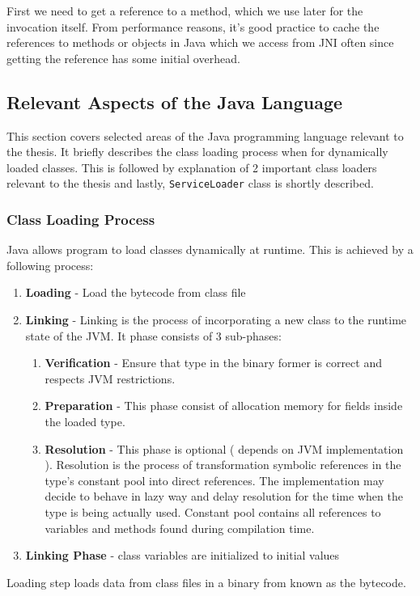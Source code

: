 First we need to get a reference to a method, which we use later for the invocation itself. From performance reasons, it's good practice to cache the references to methods or objects in Java which we access from JNI often since getting the reference has some initial overhead.

\subsection{Relevant Aspects of the  Java Language}
This section covers selected areas of the Java programming language relevant to the thesis. It briefly describes the class loading process when for dynamically loaded classes. This is followed by explanation of 2 important class loaders relevant to the thesis and lastly, \texttt{ServiceLoader} class is shortly described.
\subsubsection{Class Loading Process}
Java allows program to load classes dynamically at runtime. This is achieved by a following process:
\begin{enumerate}
	\item \textbf{Loading} - Load the bytecode from class file
	\item \textbf{Linking} - Linking is the process of incorporating a new class to the runtime state of the JVM. It phase consists of 3 sub-phases:
	\begin{enumerate}
		\item \textbf{Verification} - Ensure that type in the binary former is correct and respects JVM restrictions.
		\item \textbf{Preparation} - This phase consist of allocation memory for fields inside the loaded type.
		\item \textbf{Resolution} - This phase is optional ( depends on JVM implementation ). Resolution is the process of transformation symbolic references in the type's constant pool into direct references. The implementation may decide to behave in lazy way and delay resolution for the time when the type is being actually used. Constant pool contains all references to variables and methods found during compilation time.
	\end{enumerate}
	\item \textbf{Linking Phase} - class variables are initialized to initial values
\end{enumerate}

Loading step loads data from class files in a binary from known as the bytecode.
